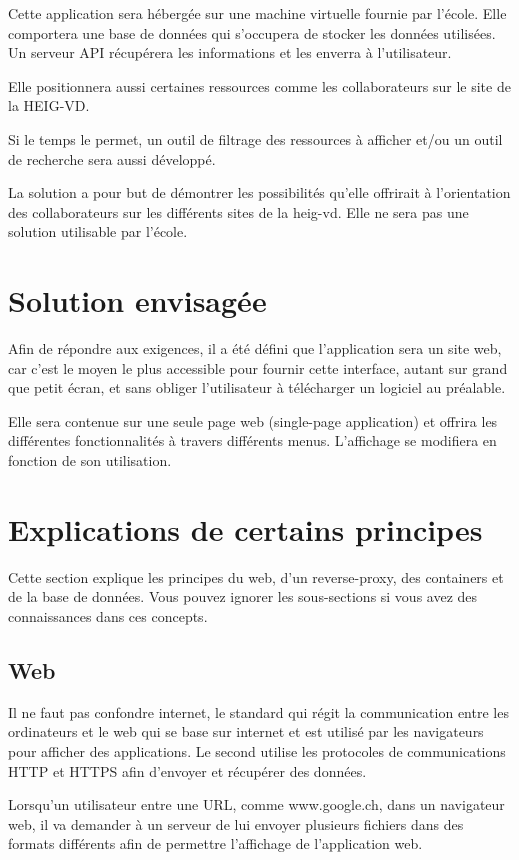 \documentclass[
    iai, %
    il, %
]{heig-tb}
\begin{document}
Cette application sera hébergée sur une machine virtuelle fournie par l'école.
Elle comportera une base de données qui s'occupera de stocker les données utilisées.
Un serveur API récupérera les informations et les enverra à l'utilisateur.

Elle positionnera aussi certaines ressources comme les collaborateurs sur le site de la HEIG-VD.

Si le temps le permet, un outil de filtrage des ressources à afficher et/ou un outil de recherche sera aussi développé.

La solution a pour but de démontrer les possibilités qu'elle offrirait à l'orientation des collaborateurs sur les différents sites de la \gls{heig-vd}.
Elle ne sera pas une solution utilisable par l'école.

\section{Solution envisagée}
Afin de répondre aux exigences, il a été défini que l'application sera un site web,
car c'est le moyen le plus accessible pour fournir cette interface, autant sur grand que petit écran,
et sans obliger l'utilisateur à télécharger un logiciel au préalable.

Elle sera contenue sur une seule page web (single-page application)
et offrira les différentes fonctionnalités à travers différents menus.
L'affichage se modifiera en fonction de son utilisation.

\section{Explications de certains principes}
Cette section explique les principes du web, d'un reverse-proxy, des containers et de la base de données.
Vous pouvez ignorer les sous-sections si vous avez des connaissances dans ces concepts.

\subsection{Web}
Il ne faut pas confondre internet, le standard qui régit la communication entre les ordinateurs
et le web qui se base sur internet et est utilisé par les navigateurs pour afficher des applications.
Le second utilise les protocoles de communications HTTP et HTTPS afin d'envoyer et récupérer des données.

Lorsqu'un utilisateur entre une URL, comme www.google.ch, dans un navigateur web, il va demander à un serveur de lui envoyer
plusieurs fichiers dans des formats différents afin de permettre l'affichage de l'application web.
\end{document}
